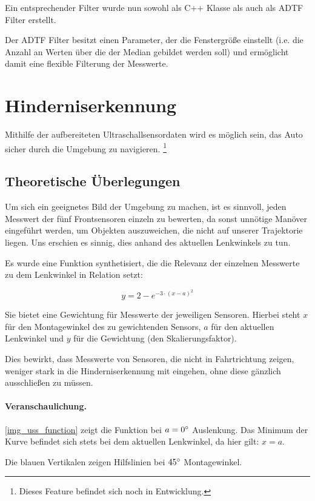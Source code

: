 \documentclass[a4paper,12pt]{report}
\begin{document}
	Ein entsprechender Filter wurde nun sowohl als C++ Klasse als auch als ADTF Filter erstellt.

	Der ADTF Filter besitzt einen Parameter, der die Fenstergröße einstellt (i.e. die Anzahl an Werten über die der Median gebildet werden soll) und ermöglicht damit eine flexible Filterung der Messwerte.

\section{Hinderniserkennung}
	
	Mithilfe der aufbereiteten Ultraschallsensordaten wird es möglich sein, das Auto sicher durch die Umgebung zu navigieren.
	\footnote{Dieses Feature befindet sich noch in Entwicklung.}
	
\subsection{Theoretische Überlegungen}
	
	Um sich ein geeignetes Bild der Umgebung zu machen, ist es sinnvoll, jeden  Messwert der fünf Frontsensoren einzeln zu bewerten, da sonst unnötige Manöver eingeführt werden, um Objekten auszuweichen, die nicht auf unserer Trajektorie liegen.
	Uns erschien es sinnig, dies anhand des aktuellen Lenkwinkels zu tun.
	
	Es wurde eine Funktion synthetisiert, die die Relevanz der einzelnen Messwerte zu dem Lenkwinkel in Relation setzt:
	
		\[y=2-e^{-3 \cdot \left( x-a \right)^2}\]
	
	Sie bietet eine Gewichtung für Messwerte der jeweiligen Sensoren.
	Hierbei steht $x$ für den Montagewinkel des zu gewichtenden Sensors, $a$ für den aktuellen Lenkwinkel und $y$ für die Gewichtung (den Skalierungsfaktor).
	
	Dies bewirkt, dass Messwerte von Sensoren, die nicht in Fahrtrichtung zeigen, weniger stark in die Hinderniserkennung mit eingehen, ohne diese gänzlich ausschließen zu müssen.
	
	\paragraph{Veranschaulichung.} \autoref{img_uss_function} zeigt die Funktion bei $a = 0\degree$ Auslenkung.
	Das Minimum der Kurve befindet sich stets bei dem aktuellen Lenkwinkel, da hier gilt: $x = a$.
	
	Die blauen Vertikalen zeigen Hilfslinien bei $45\degree$ Montagewinkel.
	
\end{document}
